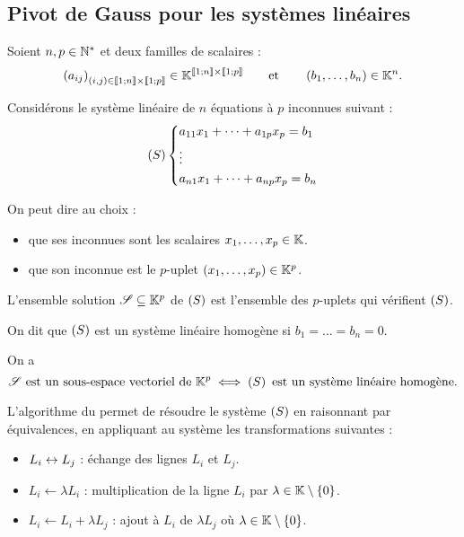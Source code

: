 \subsection{Pivot de Gauss pour les systèmes linéaires}

Soient \(n,p\in\mathbb{N}^*\) et deux familles de scalaires : \[\left(a_{ij}\right)_{\left(i,j\right)\in\left\llbracket1;n\right\rrbracket\times\left\llbracket1;p\right\rrbracket}\in\mathbb{K}^{\left\llbracket1;n\right\rrbracket\times\left\llbracket1;p\right\rrbracket}\qquad\text{et}\qquad\left(b_1,\dots,b_n\right)\in\mathbb{K}^n.\]

Considérons le système linéaire de \(n\) équations à \(p\) inconnues suivant : \[\left(S\right)\begin{dcases}
a_{11}x_1+\dots+a_{1p}x_p=b_1 \\
\vdots \\
a_{n1}x_1+\dots+a_{np}x_p=b_n
\end{dcases}\]

On peut dire au choix :

\begin{itemize}
\item que ses inconnues sont les scalaires \(x_1,\dots,x_p\in\mathbb{K}\). \\

\item que son inconnue est le \(p\)-uplet \(\left(x_1,\dots,x_p\right)\in\mathbb{K}^p\).
\end{itemize}

L'ensemble solution \(\mathscr{S}\subseteq\mathbb{K}^p\) de \(\left(S\right)\) est l'ensemble des \(p\)-uplets qui vérifient \(\left(S\right)\).

On dit que \(\left(S\right)\) est un système linéaire homogène si \(b_1=\dots=b_n=0\).

On a \[\mathscr{S}\text{ est un sous-espace vectoriel de }\mathbb{K}^p\iff\left(S\right)\text{ est un système linéaire homogène}.\]

L'algorithme du  permet de résoudre le système \(\left(S\right)\) en raisonnant par équivalences, en appliquant au système les transformations suivantes :

\begin{itemize}
\item \(L_i\leftrightarrow L_j\) : échange des lignes \(L_i\) et \(L_j\). \\

\item \(L_i\gets\lambda L_i\) : multiplication de la ligne \(L_i\) par \(\lambda\in\mathbb{K}\setminus\left\lbrace0\right\rbrace\). \\

\item \(L_i\gets L_i+\lambda L_j\) : ajout à \(L_i\) de \(\lambda L_j\) où \(\lambda\in\mathbb{K}\setminus\left\lbrace0\right\rbrace\).
\end{itemize}

